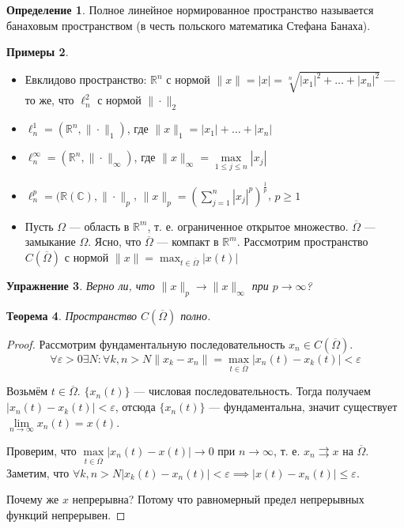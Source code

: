 \documentclass[11pt,openany,a4paper]{scrartcl}
\theoremstyle{plain}
\newtheorem{theorem}{Теорема}[section]
\newtheorem{exercise}[theorem]{Упражнение}
\theoremstyle{definition}
\newtheorem{definition}[theorem]{Определение}
\newtheorem{examples}[theorem]{Примеры}
\newcommand\mb{\mathbb}
\newcommand\real{\mb R}
\newcommand{\complex}{\mb C}
\newcommand{\uto}{\rightrightarrows}
\begin{document}
\begin{definition}
	Полное линейное нормированное пространство называется банаховым пространством (в честь 
	польского математика Стефана Банаха).
\end{definition}
\begin{examples}
	\begin{itemize}
		\item Евклидово пространство: $\real^n$ с нормой
		$\|x\| = |x| = \sqrt[n]{|x_1|^2 + \ldots + |x_n|^2}$ — то же, что
		$\ell_n^2$ с нормой $\|\cdot \|_2$
		\item $\ell_n^1 = (\real^n, \|\cdot\|_1)$, где $\|x\|_1 = |x_1| + \ldots + |x_n|$
		\item $\ell_n^\infty = (\real^n, \|\cdot\|_\infty)$,
		где $\|x\|_\infty = \max\limits_{1 \leqslant j \leqslant n} |x_j|$
		\item $\ell_n^p = (\real(\complex), \|\cdot\|_p$,
		$\|x\|_p = (\sum_{j=1}^n |x_j|^p)^{\frac{1}{p}}$, $p \geqslant 1$
		\item Пусть $\Omega$ — область в $\real^m$, т. е. ограниченное открытое множество.
		$\overline\Omega$ — замыкание $\Omega$. Ясно, что $\overline \Omega$ — компакт в
		$\real^m$. Рассмотрим пространство $C(\overline \Omega)$ с нормой
		$\|x\| = \max_{t \in \overline \Omega} |x(t)|$
	\end{itemize}
\end{examples}
\begin{exercise}
	Верно ли, что $\|x\|_p \to \|x\|_\infty$ при $p \to \infty$?
\end{exercise}

\begin{theorem}
	Пространство $C(\overline \Omega)$ полно.
\end{theorem}
\begin{proof}
	Рассмотрим фундаментальную последовательность $x_n \in C(\overline \Omega)$.
	$$
	\forall \varepsilon > 0 \exists N: \forall k, n > N \|x_k - x_n\| =
	\max_{t \in \overline \Omega} |x_n(t) - x_k(t)| < \varepsilon
	$$
	
	Возьмём $t \in \overline \Omega$. $\{x_n(t)\}$ — числовая последовательность.
	Тогда получаем $|x_n(t) - x_k(t)| < \varepsilon$, отсюда $\{x_n(t)\}$ — 
	фундаментальна, значит существует $\lim\limits_{n \to \infty} x_n(t) = x(t)$.
	
	Проверим, что $\max\limits_{t \in \overline \Omega} |x_n(t) - x(t)| \to 0$ при
	$n \to \infty$, т. е. $x_n \uto x$ на $\overline \Omega$.
	Заметим, что $\forall k, n > N |x_k(t) - x_n(t)| < \varepsilon \implies
	|x(t) - x_n(t)| \leqslant \varepsilon$.
	
	Почему же $x$ непрерывна? Потому что равномерный предел непрерывных функций 
	непрерывен.

\end{proof}
\end{document}
